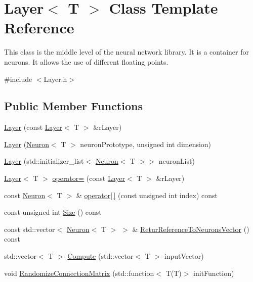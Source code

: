 \hypertarget{class_layer}{\section{Layer$<$ T $>$ Class Template Reference}
\label{class_layer}
}


This class is the middle level of the neural network library. It is a container for neurons. It allows the use of different floating points.  




{\ttfamily \#include $<$Layer.\-h$>$}

\subsection*{Public Member Functions}
\begin{DoxyCompactItemize}
\item 
\hyperlink{class_layer_ae0654b5e7121979d405c2fc361ef02aa}{Layer} (const \hyperlink{class_layer}{Layer}$<$ T $>$ \&r\-Layer)
\item 
\hyperlink{class_layer_a7d5cf06e8f644207527253817f5b0676}{Layer} (\hyperlink{class_neuron}{Neuron}$<$ T $>$ neuron\-Prototype, unsigned int dimension)
\item 
\hyperlink{class_layer_a65ed4f2c35380e4f8513f450aadc024f}{Layer} (std\-::initializer\-\_\-list$<$ \hyperlink{class_neuron}{Neuron}$<$ T $>$$>$ neuron\-List)
\item 
\hyperlink{class_layer}{Layer}$<$ T $>$ \hyperlink{class_layer_aee99a6405e2431801cbadf6ea72b227f}{operator=} (const \hyperlink{class_layer}{Layer}$<$ T $>$ \&r\-Layer)
\item 
const \hyperlink{class_neuron}{Neuron}$<$ T $>$ \& \hyperlink{class_layer_afe63391049cda09e74df10410b501275}{operator\mbox{[}$\,$\mbox{]}} (const unsigned int index) const 
\item 
const unsigned int \hyperlink{class_layer_ae13b1978d32f18cb1d80c6b23358ca36}{Size} () const 
\item 
const std\-::vector$<$ \hyperlink{class_neuron}{Neuron}$<$ T $>$ $>$ \& \hyperlink{class_layer_a6a3743652e26f0870e9eba938248ae5f}{Retur\-Reference\-To\-Neurons\-Vector} () const 
\item 
std\-::vector$<$ T $>$ \hyperlink{class_layer_a1401e5314597e415216efc1417b946e8}{Compute} (std\-::vector$<$ T $>$ input\-Vector)
\item 
void \hyperlink{class_layer_a321180e42ad2dbf59a6b237d789b0538}{Randomize\-Connection\-Matrix} (std\-::function$<$ T(T)$>$ init\-Function)
$$
\end{DoxyCompactItemize}
